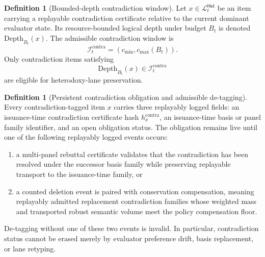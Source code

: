 \documentclass[11pt]{article}
\theoremstyle{definition}
\newtheorem{definition}[theorem]{Definition}
\newcommand{\1}{\mathbf{1}}
\newcommand{\Het}{\mathsf{Het}}
\begin{document}
\begin{definition}[Bounded-depth contradiction window]
Let $x\in\mathcal L_t^{\Het}$ be an item carrying a replayable contradiction certificate relative to the current dominant evaluator state. Its resource-bounded logical depth under budget $B_t$ is denoted $\mathrm{Depth}_{B_t}(x)$. The admissible contradiction window is
\[
\mathcal I_t^{\mathrm{contra}}=(c_{\min},c_{\max}(B_t)).
\]
Only contradiction items satisfying
\[
\mathrm{Depth}_{B_t}(x)\in \mathcal I_t^{\mathrm{contra}}
\]
are eligible for heterodoxy-lane preservation.
\end{definition}

\begin{definition}[Persistent contradiction obligation and admissible de-tagging]\label{def:contra_obligation}
Every contradiction-tagged item $x$ carries three replayably logged fields: an issuance-time contradiction certificate hash $h_x^{\mathrm{contra}}$, an issuance-time basis or panel family identifier, and an open obligation status. The obligation remains live until one of the following replayably logged events occurs:
\begin{enumerate}[label=(\roman*), leftmargin=2em]
  \item a multi-panel rebuttal certificate validates that the contradiction has been resolved under the successor basis family while preserving replayable transport to the issuance-time family, or
  \item a counted deletion event is paired with conservation compensation, meaning replayably admitted replacement contradiction families whose weighted mass and transported robust semantic volume meet the policy compensation floor.
\end{enumerate}
De-tagging without one of these two events is invalid. In particular, contradiction status cannot be erased merely by evaluator preference drift, basis replacement, or lane retyping.
\end{definition}
\end{document}
